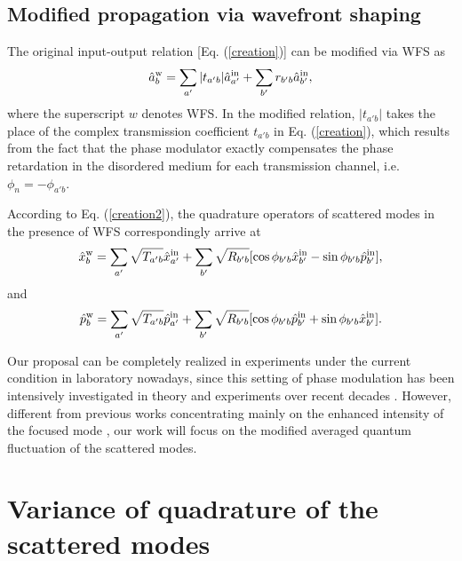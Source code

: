\documentclass[9pt,twocolumn,twoside]{osajnl}
\begin{document}
\subsection{Modified propagation via wavefront shaping}


The original input-output relation [Eq. (\ref{creation})] can be modified via WFS \cite{vellekoop2007} as
\begin{align}
\hat{a}_{b}^{\rm{w}} = \sum_{a'}{|t_{a'b }|  \hat{a}_{a'}^{\rm{in}}} + \sum_{b'}{r_{b'b }  \hat{a}_{b'}^{\rm{in}}},
\label{creation2}
\end{align}
where the superscript $w$ denotes WFS. In the modified relation, $|t_{a'b }| $ takes the place of the complex transmission coefficient $t_{a'b}$ in Eq. (\ref{creation}), which results from the fact that the phase modulator exactly compensates the phase retardation in the disordered medium for each transmission channel, i.e. $\phi_{n} = -\phi_{a'b}$.

According to Eq. (\ref{creation2}), the quadrature operators of scattered modes in the presence of WFS correspondingly arrive at
\begin{align}
\label{xp1}
\hat{x}_b^{\rm{w}} = \sum_{a'}{\sqrt{T_{a'b}} \hat{x}_{a'}^{\rm{in}} } + \sum_{b'}{\sqrt{R_{b'b}} [\cos \phi_{b'b} \hat{x}_{b'}^{\rm{in}} - \sin \phi_{b'b} \hat{p}_{b'}^{\rm{in}}] },
\end{align}
and
\begin{align}
\label{xp2}
\hat{p}_b^{\rm{w}} = \sum_{a'}{\sqrt{T_{a'b}} \hat{p}_{a'}^{\rm{in}} } + \sum_{b'}{\sqrt{R_{b'b}} [\cos \phi_{b'b} \hat{p}_{b'}^{\rm{in}} + \sin \phi_{b'b} \hat{x}_{b'}^{\rm{in}}] }.
\end{align}


Our proposal can be completely realized in experiments under the current condition in laboratory nowadays, since this setting of phase modulation has been intensively investigated in theory and experiments over recent decades \cite{vellekoop2007,vellekoop2008,popoff2010tm,yoon2015,lerosey2007,tay2014,wang2015,ojambati2016,mounaix2016,fang2017,peng2018,stern2019}. However, different from previous works concentrating mainly on the enhanced intensity of the focused mode \cite{vellekoop2007,vellekoop2008,thompson2016,osnabrugge2019}, our work will focus on the modified averaged quantum fluctuation of the scattered modes.


\section{Variance of quadrature of the scattered modes}
\end{document}
